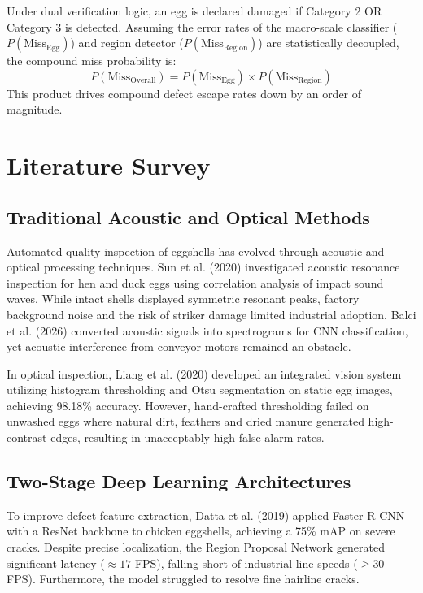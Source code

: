 \documentclass[12pt,a4paper]{report}
\begin{document}
Under dual verification logic, an egg is declared damaged if Category 2 OR Category 3 is detected. Assuming the error rates of the macro-scale classifier ($P(\text{Miss}_{\text{Egg}})$) and region detector ($P(\text{Miss}_{\text{Region}})$) are statistically decoupled, the compound miss probability is:
\begin{equation}
P(\text{Miss}_{\text{Overall}}) = P(\text{Miss}_{\text{Egg}}) \times P(\text{Miss}_{\text{Region}})
\end{equation}
This product drives compound defect escape rates down by an order of magnitude.

\chapter{Literature Survey}

\section{Traditional Acoustic and Optical Methods}

Automated quality inspection of eggshells has evolved through acoustic and optical processing techniques. Sun et al. (2020) investigated acoustic resonance inspection for hen and duck eggs using correlation analysis of impact sound waves. While intact shells displayed symmetric resonant peaks, factory background noise and the risk of striker damage limited industrial adoption. Balci et al. (2026) converted acoustic signals into spectrograms for CNN classification, yet acoustic interference from conveyor motors remained an obstacle.

In optical inspection, Liang et al. (2020) developed an integrated vision system utilizing histogram thresholding and Otsu segmentation on static egg images, achieving 98.18\% accuracy. However, hand-crafted thresholding failed on unwashed eggs where natural dirt, feathers and dried manure generated high-contrast edges, resulting in unacceptably high false alarm rates.

\section{Two-Stage Deep Learning Architectures}

To improve defect feature extraction, Datta et al. (2019) applied Faster R-CNN with a ResNet backbone to chicken eggshells, achieving a 75\% mAP on severe cracks. Despite precise localization, the Region Proposal Network generated significant latency ($\approx 17$ FPS), falling short of industrial line speeds ($\ge 30$ FPS). Furthermore, the model struggled to resolve fine hairline cracks.
\end{document}

